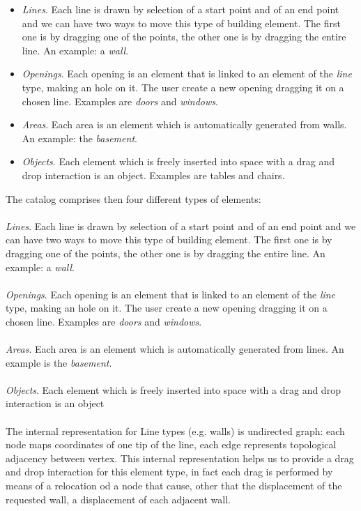 \begin{itemize}
\item \emph{Lines}. Each line is drawn by selection of a start point and of an end point and we can have two ways to move this type of building element. The first one is by dragging one of the points, the other one is by dragging the entire line. An example: a \emph{wall}.

\item \emph{Openings}. Each opening is an element that is linked to an element of the \emph{line} type, making an hole on it. The user create a new opening dragging it on a chosen line. Examples are \emph{doors} and \emph{windows}.

\item \emph{Areas}. Each area is an element which is automatically generated from walls. An example: the \emph{basement}.

\item \emph{Objects}. Each element which is freely inserted into space with a drag and drop interaction is an object. Examples are tables and chairs.
\end{itemize}



The catalog comprises then four different types of elements:\\\\
\noindent \emph{Lines}. Each line is drawn by selection of a start point and of an end point and we can have two ways to move this type of building element. The first one is by dragging one of the points, the other one is by dragging the entire line. An example: a \emph{wall}.\\\\
\noindent \emph{Openings}. Each opening is an element that is linked to an element of the \emph{line} type, making an hole on it. The user create a new opening dragging it on a chosen line. Examples are \emph{doors} and \emph{windows}.\\\\
\noindent \emph{Areas}. Each area is an element which is automatically generated from lines. An example is the \emph{basement}.\\\\
\noindent \emph{Objects}. Each element which is freely inserted into space with a drag and drop interaction is an object\\\\
The internal representation for Line types (e.g. walls) is undirected graph: each node maps coordinates of one tip of the line, each edge represents topological adjacency between vertex. This internal representation helps us to provide a drag and drop interaction for this element type, in fact each drag is performed by means of a relocation od a node that cause, other that the displacement of the requested wall, a displacement of each adjacent wall.


